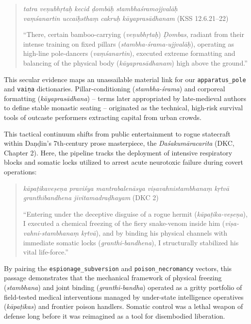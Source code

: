 \documentclass[11pt,twoside,letterpaper]{article}
\begin{document}
\begin{quote}
\small
\textit{tatra ve\d{n}ubh\d{r}ta\d{h} kecid \d{d}omb\={a}\d{h} stambha\'sramojjval\={a}\d{h} \\
va\d{m}\'sanartin uccai\d{h}stha\d{m} cakru\d{h} k\={a}yapras\={a}dhanam} (KSS 12.6.21–22)
\medskip

``There, certain bamboo-carrying (\textit{ve\d{n}ubh\d{r}ta\d{h}}) \textit{\d{D}ombas}, radiant from their intense training on fixed pillars (\textit{stambha-\'srama-ujjval\={a}\d{h}}), operating as high-line pole-dancers (\textit{va\d{m}\'sanartin}), executed extreme formatting and balancing of the physical body (\textit{k\={a}yapras\={a}dhanam}) high above the ground.''
\end{quote}

This secular evidence maps an unassailable material link for our \texttt{apparatus\_pole} and \texttt{vai\d{n}a} dictionaries. Pillar-conditioning (\textit{stambha-\'srama}) and corporeal formatting (\textit{k\={a}yapras\={a}dhana}) -- terms later appropriated by late-medieval authors to define stable monastic seating -- originated as the technical, high-risk survival tools of outcaste performers extracting capital from urban crowds.

This tactical continuum shifts from public entertainment to rogue statecraft within Da\d{n}\d{d}in's 7th-century prose masterpiece, the \textit{Da\'sakum\={a}racarita} (DKC, Chapter 2). Here, the pipeline tracks the deployment of intensive respiratory blocks and somatic locks utilized to arrest acute neurotoxic failure during covert operations:

\begin{quote}
\small
\textit{k\={a}pa\d{t}ikave\d{s}e\d{n}a pravi\'sya mantrabalen\={a}sya vi\d{s}avahnistambhana\d{m} k\d{r}tv\={a} granthibandhena j\={i}vitamadra\d{d}hayam} (DKC 2)
\medskip

``Entering under the deceptive disguise of a rogue hermit (\textit{k\={a}pa\d{t}ika-ve\d{s}e\d{n}a}), I executed a chemical freezing of the fiery snake-venom inside him (\textit{vi\d{s}a-vahni-stambhana\d{m} k\d{r}tv\={a}}), and by binding his physical channels with immediate somatic locks (\textit{granthi-bandhena}), I structurally stabilized his vital life-force.''
\end{quote}

By pairing the \texttt{espionage\_subversion} and \texttt{poison\_necromancy} vectors, this passage demonstrates that the mechanical framework of physical freezing (\textit{stambhana}) and joint binding (\textit{granthi-bandha}) operated as a gritty portfolio of field-tested medical interventions managed by under-state intelligence operatives (\textit{k\={a}pa\d{t}ikas}) and frontier poison handlers. Somatic control was a lethal weapon of defense long before it was reimagined as a tool for disembodied liberation.
\end{document}

